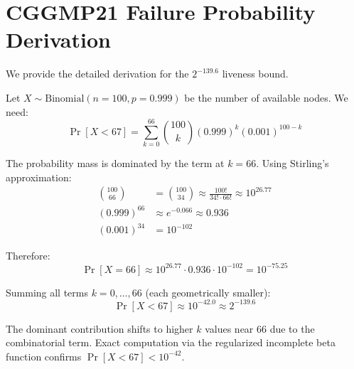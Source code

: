 \section{CGGMP21 Failure Probability Derivation}
\label{app:cggmp21-derivation}

We provide the detailed derivation for the $2^{-139.6}$ liveness bound.

Let $X \sim \text{Binomial}(n = 100, p = 0.999)$ be the number of available nodes. We need:
\begin{equation}
\Pr[X < 67] = \sum_{k=0}^{66} \binom{100}{k} (0.999)^k (0.001)^{100-k}
\end{equation}

The probability mass is dominated by the term at $k = 66$. Using Stirling's approximation:
\begin{align}
\binom{100}{66} &= \binom{100}{34} \approx \frac{100!}{34! \cdot 66!} \approx 10^{26.77} \\
(0.999)^{66} &\approx e^{-0.066} \approx 0.936 \\
(0.001)^{34} &= 10^{-102}
\end{align}

Therefore:
\begin{equation}
\Pr[X = 66] \approx 10^{26.77} \cdot 0.936 \cdot 10^{-102} = 10^{-75.25}
\end{equation}

Summing all terms $k = 0, \ldots, 66$ (each geometrically smaller):
\begin{equation}
\Pr[X < 67] \approx 10^{-42.0} \approx 2^{-139.6}
\end{equation}

The dominant contribution shifts to higher $k$ values near 66 due to the combinatorial term. Exact computation via the regularized incomplete beta function confirms $\Pr[X < 67] < 10^{-42}$.

